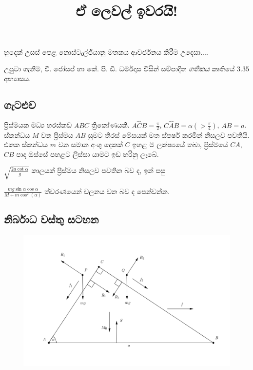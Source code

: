 \documentclass[11pt]{article}
\begin{document}
    
    \title{ ඒ ලෙවල් ඉවරයි!}
    \maketitle
    
    

    
    හුදෙක් උසස් පෙළ නොස්ටැල්ජියානු මතකය ආවර්ජනය කිරීම උදෙසා....

උපුටා ගැනීම, වී. ජෝසප් හා කේ. පී. ඩී. ධර්මදාස විසින් සම්පාදිත
\emph{ගතිකය} කෘතියේ 3.35 අභ්‍යාසය.

\subsection{ගැටළුව}\label{uxd9cuxda7uxdc5uxdc0}

ප්‍රිස්මයක මධ්‍ය හරස්කඩ \(ABC\) ත්‍රිකෝණයකි.
\(A\hat{C}B=\frac{\pi}{2}\),
\(C\hat{A}B=\alpha \left(>\frac{\pi}{4}\right)\), \(AB=a\). ස්කන්ධය
\(M\) වන ප්‍රිස්මය \(AB\) සුමට තිරස් මේසයක් මත ස්පර්ෂ කරමින් නිසලව
පවතියි. එකක ස්කන්ධය \(m\) වන සමාන අංශු දෙකක් \(C\) ඉහළ ම ලක්ෂ්‍යයේ තබා,
ප්‍රිස්මයේ \(CA\), \(CB\) පාද ඔස්සේ පහළට ලිස්සා යාමට ඉඩ හරිනු ලැබේ.

\(\sqrt{\frac{2a\cot\alpha}{g}}\) කාලයක් ප්‍රිස්මය නිසලව පවතින බව ද, ඉන්
පසු

\(\frac{mg\sin\alpha\cos\alpha}{M+m\cos^2\left(\alpha\right)}\)
ත්වරණයෙන් චලනය වන බව ද පෙන්වන්න.

\subsection{නිර්බාධ වස්තු
සටහන}\label{uxdb1uxdbbuxdb6uxdb0-uxdc0uxdc3uxdad-uxdc3uxda7uxdc4uxdb1}

\begin{figure}
\centering
\includegraphics{free_body_diag.png}
\caption{}
\end{figure}
\end{document}
